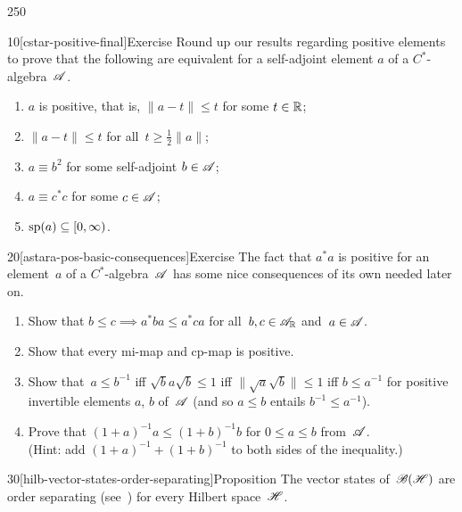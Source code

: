 \begin{parsec}{250}
\begin{point}{10}[cstar-positive-final]{Exercise}%
%
Round up our results regarding positive elements
to 
prove that
the following are equivalent
for a self-adjoint element $a$ of a $C^*$-algebra~$\mathscr{A}$.
\begin{enumerate}
\item 
$a$ is positive, that is,  $\|a-t\|\leq t$
for some $t\in \mathbb{R}$;
\item
$\|a-t\|\leq t$ for all~$t\geq \frac{1}{2}\|a\|$;
\item
$a\equiv b^2$ for some self-adjoint $b\in\mathscr{A}$;
\item
$a\equiv c^* c$ for some $c\in\mathscr{A}$;
\item
$\mathrm{sp}(a)\subseteq [0,\infty)$.
\end{enumerate}%
\spacingfix%
\end{point}%
\begin{point}{20}[astara-pos-basic-consequences]{Exercise}%
The fact that $a^*a$ is positive
for an element~$a$ of a $C^*$-algebra~$\mathscr{A}$
has some nice consequences
of its own needed later on.
\begin{enumerate}
\item
Show that $b\leq c\implies a^*ba \leq a^*ca$
for all~$b,c\in\mathscr{A}_{\mathbb{R}}$ and~$a\in\mathscr{A}$.
\item
Show that every mi-map and cp-map is positive.
\item
Show that~$a\leq b^{-1}$ 
iff $\sqrt{b}a\sqrt{b}\leq 1$
iff $\|\sqrt{a}\sqrt{b}\|\leq 1$
iff $b\leq a^{-1}$
for positive invertible elements $a$, $b$ of~$\mathscr{A}$
(and so $a\leq b$ entails $b^{-1}\leq a^{-1}$).
\item
Prove that $(1+a)^{-1}a\leq (1+b)^{-1}b$
for $0\leq a\leq b$ from~$\mathscr{A}$.\\
(Hint: add $(1+a)^{-1} + (1+b)^{-1}$
to both sides of the inequality.)
\end{enumerate}%
\spacingfix%
\end{point}%
\begin{point}{30}[hilb-vector-states-order-separating]{Proposition}%
The vector states
of~$\mathscr{B}(\mathscr{H})$
are order separating (see~)
for every Hilbert space~$\mathscr{H}$.
\end{point}
\end{parsec}
